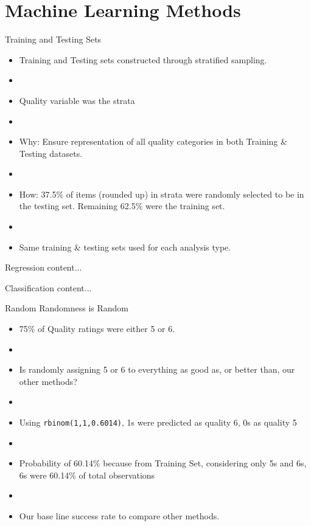 \documentclass{beamer}
\begin{document}
\section{Machine Learning Methods}
\begin{frame}{Training and Testing Sets}
	\begin{itemize}
	\item Training and Testing sets constructed through stratified sampling.
	\item[]
	\item Quality variable was the strata
	\item[]
	\item Why: Ensure representation of all quality categories in both Training \& Testing datasets.
	\item[]
	\item How: 37.5\% of items (rounded up) in strata were randomly selected to be in the testing set. Remaining 62.5\% were the training set.
	\item[]
	\item Same training \& testing sets used for each analysis type.
	\end{itemize}
\end{frame}


\begin{frame}{Regression}
content...
\end{frame}

\begin{frame}{Classification}
content...
\end{frame}

\begin{frame}{Random Randomness is Random}
	\begin{itemize}
	\item 75\% of Quality ratings were either 5 or 6. 
	\item[]
	\item Is randomly assigning 5 or 6 to everything as good as, or better than, our other methods?
	\item[]
	\item Using \texttt{rbinom(1,1,0.6014)}, 1s were predicted as quality 6, 0s as quality 5
	\item[]
	\item Probability of 60.14\% because from Training Set, considering only 5s and 6s, 6s were 60.14\% of total observations
	\item[]
	\item Our base line success rate to compare other methods.
	\end{itemize}
\end{frame}
\end{document}
